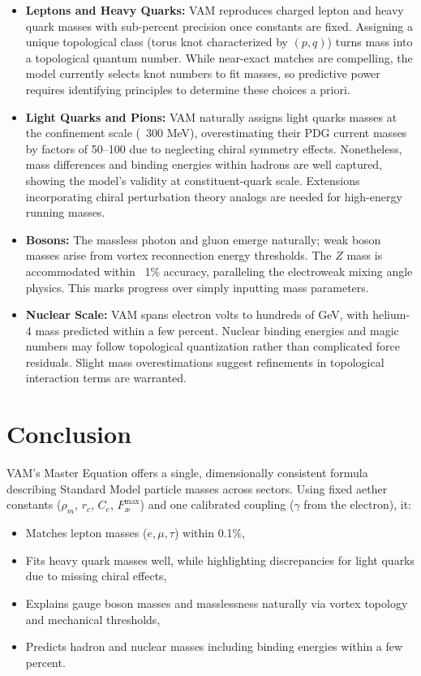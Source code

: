 \begin{itemize}
    \item \textbf{Leptons and Heavy Quarks:} VAM reproduces charged lepton and heavy quark masses with sub-percent precision once constants are fixed. Assigning a unique topological class (torus knot characterized by $(p,q)$) turns mass into a topological quantum number. While near-exact matches are compelling, the model currently selects knot numbers to fit masses, so predictive power requires identifying principles to determine these choices a priori.

    \item \textbf{Light Quarks and Pions:} VAM naturally assigns light quarks masses at the confinement scale (~300 MeV), overestimating their PDG current masses by factors of 50–100 due to neglecting chiral symmetry effects. Nonetheless, mass differences and binding energies within hadrons are well captured, showing the model’s validity at constituent-quark scale. Extensions incorporating chiral perturbation theory analogs are needed for high-energy running masses.

    \item \textbf{Bosons:} The massless photon and gluon emerge naturally; weak boson masses arise from vortex reconnection energy thresholds. The $Z$ mass is accommodated within ~1\% accuracy, paralleling the electroweak mixing angle physics. This marks progress over simply inputting mass parameters.

    \item \textbf{Nuclear Scale:} VAM spans electron volts to hundreds of GeV, with helium-4 mass predicted within a few percent. Nuclear binding energies and magic numbers may follow topological quantization rather than complicated force residuals. Slight mass overestimations suggest refinements in topological interaction terms are warranted.
\end{itemize}

\section{Conclusion}

VAM’s Master Equation offers a single, dimensionally consistent formula describing Standard Model particle masses across sectors. Using fixed aether constants ($\rho_{\scriptscriptstyle\boldsymbol\!m}$, $r_c$, $C_e$, $F^{\max}_{\text{\ae}}$) and one calibrated coupling ($\gamma$ from the electron), it:

\begin{itemize}
    \item Matches lepton masses ($e, \mu, \tau$) within 0.1\%,
    \item Fits heavy quark masses well, while highlighting discrepancies for light quarks due to missing chiral effects,
    \item Explains gauge boson masses and masslessness naturally via vortex topology and mechanical thresholds,
    \item Predicts hadron and nuclear masses including binding energies within a few percent.
\end{itemize}

